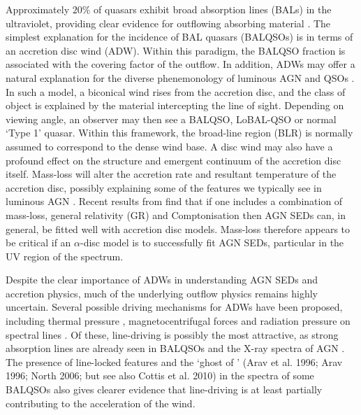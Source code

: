 \documentclass[preprint, a4paper, 11pt]{aastex}
\begin{document}
Approximately $20\%$ of quasars exhibit broad absorption lines (BALs) in the ultraviolet,
providing clear evidence for outflowing absorbing material
\citep{weymann1991, reichard2003, knigge2008, turnermiller2009, allen2011}.
The simplest explanation for the incidence of 
BAL quasars (BALQSOs) is in terms of an accretion disc wind (ADW). 
Within this paradigm, the BALQSO fraction is associated with
the covering factor of the outflow.
In addition, ADWs may offer a natural explanation for the
diverse phenemonology of luminous AGN and QSOs \citep[e.g.][]{MCGV95, elvis2000}. 
In such a model, a biconical wind rises from 
the accretion disc, and the class of object is explained by the material
intercepting the line of sight. Depending on viewing angle, an observer 
may then see a BALQSO, LoBAL-QSO or normal `Type 1' quasar.
Within this framework, the broad-line region (BLR) is normally
assumed to correspond to the dense wind base.
A disc wind may also have a profound effect on the structure and 
emergent continuum of the accretion disc itself.
Mass-loss will alter the accretion rate and resultant 
temperature of the accretion disc, possibly explaining some 
of the features we typically see in luminous AGN \citep{laordavis2014}.
Recent results from \cite{capellupo2015} find 
that if one includes a combination of mass-loss, general relativity (GR) and Comptonisation
then AGN SEDs can, in general, be fitted well with accretion disc models.
Mass-loss therefore appears to be critical if an $\alpha$-disc
model is to successfully fit AGN SEDs, particular in the UV region of the spectrum.

Despite the clear importance of ADWs in understanding AGN SEDs and accretion physics, 
much of the underlying outflow physics remains highly uncertain. 
Several possible driving mechanisms for ADWs have been proposed, including
thermal pressure \citep{weymann1982, begelman1991}, magnetocentrifugal forces 
\citep{blandfordpayne,pelletier_pudritz} and 
radiation pressure on spectral lines \citep[`line-driving';][]{lucysolomon1970,shlosman1985,MCGV95}.
Of these, line-driving is possibly the most attractive, as
strong absorption lines are already seen in BALQSOs and the X-ray spectra of AGN 
\citep{reeves2003,poundsreeves2009,tombesi2010a}.
The presence of line-locked features \citep{bowler2014} 
and the `ghost of \la' (Arav et al. 1996; Arav 1996; North 2006; but see 
also Cottis et al. 2010) \nocite{arav1995, arav1996, north2006,cottis2010}
in the spectra of some BALQSOs also gives clearer evidence that line-driving is
at least partially contributing to the acceleration of the wind.
\end{document}
